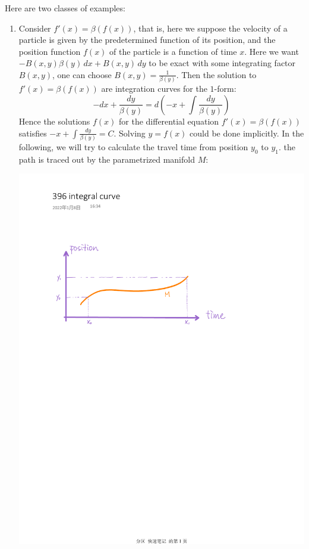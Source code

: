 \documentclass[15pt]{book}
\theoremstyle{break}
\theoremstyle{break}
\begin{document}
Here are two classes of examples:
\begin{enumerate}
\item Consider $f'(x) = \beta(f(x))$, that is, here we suppose the velocity of a particle is given by the predetermined function of its position, and the position function $f(x)$ of the particle is a function of time $x$. Here we want $-B(x,y) \beta(y)\, dx + B(x,y)\, dy$ to be exact with some integrating factor $B(x,y)$, one can choose $B(x,y) = \frac{1}{\beta (y)}$. Then the solution to  $f'(x) = \beta(f(x))$ are integration curves for the $1$-form: $$-dx + \frac{dy}{\beta(y)} = d\left(-x + \int \frac{dy}{\beta(y)}\right)$$ Hence the solutions $f(x)$ for the differential equation $f'(x) = \beta(f(x))$ satisfies $-x + \int \frac{dy}{\beta(y)} = C$. Solving $y = f(x)$ could be done implicitly. In the following, we will try to calculate the travel time from position $y_0$ to $y_1$. the path is traced out by the parametrized manifold $M$: 
\begin{center}
\includegraphics[scale=0.7]{integralCurve.pdf}

\end{center}
\end{enumerate}
\end{document}
